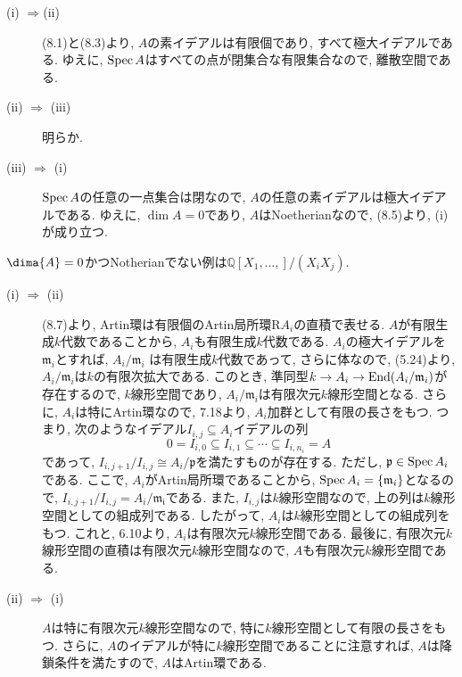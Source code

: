 \documentclass[dvipdfmx]{jsarticle}
\begin{document}
    \begin{problem}
        \begin{description}
            \item[(i) $\Rightarrow$(ii)]
                (8.1)と(8.3)より, $A$の素イデアルは有限個であり, すべて極大イデアルである.
                ゆえに, $\operatorname{Spec}{A}$はすべての点が閉集合な有限集合なので, 離散空間である.
            \item[(ii) $\Rightarrow$ (iii)]
                明らか.
            \item[(iii) $\Rightarrow$ (i)]
                $\operatorname{Spec}{A}$の任意の一点集合は閉なので, $A$の任意の素イデアルは極大イデアルである.
                ゆえに, $\dim{A} = 0$であり, $A$はNoetherianなので, (8.5)より, (i)が成り立つ.
        \end{description}
    \end{problem}

    \begin{note}
        $\dima{A} = 0$かつNotherianでない例は$\mathbb{Q}[X_1, \dots, ]/(X_iX_j)$.
    \end{note}

    \begin{problem}
        \begin{description}
            \item[(i) $\Rightarrow$ (ii)] (8.7)より, Artin環は有限個のArtin局所環R$A_i$の直積で表せる.
            $A$が有限生成$k$代数であることから, $A_i$も有限生成$k$代数である.
            $A_i$の極大イデアルを$\mathfrak{m}_i$とすれば, $A_i/\mathfrak{m}_i$
            は有限生成$k$代数であって, さらに体なので, (5.24)より,
            $A_i/\mathfrak{m}_i$は$k$の有限次拡大である.
            このとき, 準同型$k \to A_i \to \operatorname{End}(A_i/\mathfrak{m}_i)$が存在するので, $k$線形空間であり,
            $A_i/\mathfrak{m}_i$は有限次元$k$線形空間となる.
            さらに, $A_i$は特にArtin環なので, \color{red}7.18\color{black}より,
            $A_i$加群として有限の長さをもつ.
            つまり, 次のようなイデアル$I_{i,j} \subseteq A_i$イデアルの列
            \[
                0 = I_{i,0} \subseteq I_{i,1} \subseteq \cdots \subseteq I_{i,n_i} = A
            \]
            であって, $I_{i,j+1}/I_{i,j} \cong A_i/\mathfrak{p}$を満たすものが存在する.
            ただし, $\mathfrak{p} \in \operatorname{Spec}{A_i}$である.
            ここで, $A_i$がArtin局所環であることから, $\operatorname{Spec}{A_i}  = \{\mathfrak{m}_i\}$となるので,
            $I_{i, j+1}/I_{i,j} = A_i/\mathfrak{m_i}$である.
            また, $I_{i,j}$は$k$線形空間なので, 上の列は$k$線形空間としての組成列である.
            したがって, $A_i$は$k$線形空間としての組成列をもつ.
            これと, 6.10より, $A_i$は有限次元$k$線形空間である.
            最後に, 有限次元$k$線形空間の直積は有限次元$k$線形空間なので, $A$も有限次元$k$線形空間である.
            \item [(ii) $\Rightarrow$ (i)]
            $A$は特に有限次元$k$線形空間なので, 特に$k$線形空間として有限の長さをもつ.
            さらに, $A$のイデアルが特に$k$線形空間であることに注意すれば, $A$は降鎖条件を満たすので, $A$はArtin環である.
         \end{description}
    \end{problem}
\end{document}

